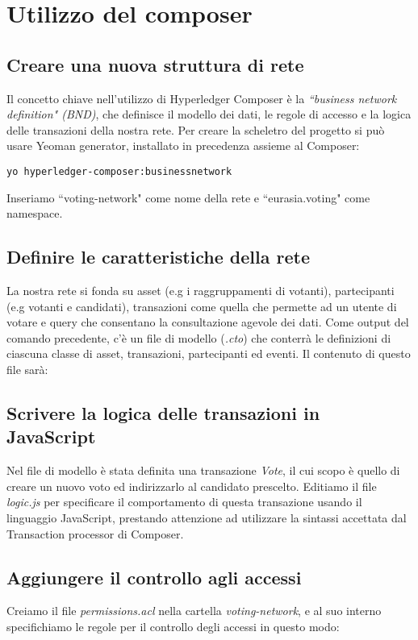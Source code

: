 \section{Utilizzo del composer}
	\subsection{Creare una nuova struttura di rete}
		Il concetto chiave nell'utilizzo di Hyperledger Composer è la \emph{``business network definition" (BND)}, che definisce il modello dei dati, le regole di accesso e la logica delle transazioni della nostra rete. Per creare la scheletro del progetto si può usare Yeoman generator, installato in precedenza assieme al Composer:
\begin{lstlisting}
yo hyperledger-composer:businessnetwork
\end{lstlisting}
		Inseriamo ``voting-network" come nome della rete e ``eurasia.voting" come namespace.
	\subsection{Definire le caratteristiche della rete}
		La nostra rete si fonda su asset (e.g i raggruppamenti di votanti), partecipanti (e.g votanti e candidati), transazioni come quella che permette ad un utente di votare e query che consentano la consultazione agevole dei dati. Come output del comando precedente, c'è un file di modello (\emph{.cto}) che conterrà le definizioni di ciascuna classe di asset, transazioni, partecipanti ed eventi. Il contenuto di questo file sarà:
		

	\subsection{Scrivere la logica delle transazioni in JavaScript}
		Nel file di modello è stata definita una transazione \emph{Vote}, il cui scopo è quello di creare un nuovo voto ed indirizzarlo al candidato prescelto. Editiamo il file \emph{logic.js} per specificare il comportamento di questa transazione usando il linguaggio JavaScript, prestando attenzione ad utilizzare la sintassi accettata dal Transaction processor di Composer.
		

	\subsection{Aggiungere il controllo agli accessi}
		Creiamo il file \emph{permissions.acl} nella cartella \emph{voting-network}, e al suo interno specifichiamo le regole per il controllo degli accessi in questo modo:
		

